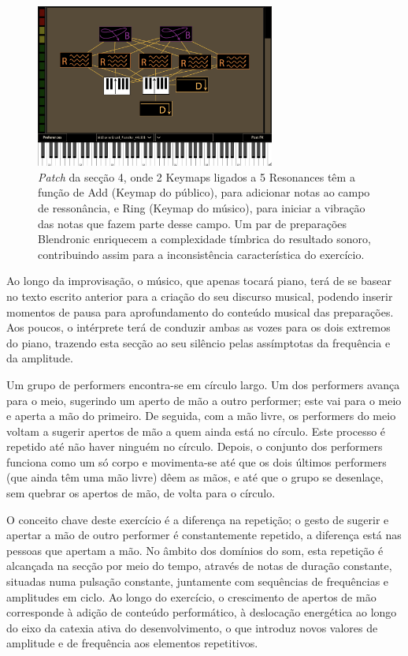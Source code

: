 \documentclass[../main.tex]{subfiles}
\begin{document}
\begin{figure}[h]
    \centering
    \captionsetup{width=0.8\textwidth}
    \includegraphics[width=0.7\textwidth]{images/bit4.png}
    \caption{\textsl{Patch} da secção 4, onde 2 Keymaps ligados a 5 Resonances têm a função de Add (Keymap do público), para adicionar notas ao campo de ressonância, e Ring (Keymap do músico), para iniciar a vibração das notas que fazem parte desse campo. Um par de preparações Blendronic enriquecem a complexidade tímbrica do resultado sonoro, contribuindo assim para a inconsistência característica do exercício.}
    \label{fig:bit4}
\end{figure}

Ao longo da improvisação, o músico, que apenas tocará piano, terá de se basear no texto escrito anterior para a criação do seu discurso musical, podendo inserir momentos de pausa para aprofundamento do conteúdo musical das preparações. Aos poucos, o intérprete terá de conduzir ambas as vozes para os dois extremos do piano, trazendo esta secção ao seu silêncio pelas assímptotas da frequência e da amplitude.

\begin{performex}
    Um grupo de performers encontra-se em círculo largo. Um dos performers avança para o meio, sugerindo um aperto de mão a outro performer; este vai para o meio e aperta a mão do primeiro. De seguida, com a mão livre, os performers do meio voltam a sugerir apertos de mão a quem ainda está no círculo. Este processo é repetido até não haver ninguém no círculo. Depois, o conjunto dos performers funciona como um só corpo e movimenta-se até que os dois últimos performers (que ainda têm uma mão livre) dêem as mãos, e até que o grupo se desenlaçe, sem quebrar os apertos de mão, de volta para o círculo.
\end{performex}

O conceito chave deste exercício é a diferença na repetição; o gesto de sugerir e apertar a mão de outro performer é constantemente repetido, a diferença está nas pessoas que apertam a mão. No âmbito dos domínios do som, esta repetição é alcançada na secção por meio do tempo, através de notas de duração constante, situadas numa pulsação constante, juntamente com sequências de frequências e amplitudes em ciclo. Ao longo do exercício, o crescimento de apertos de mão corresponde à adição de conteúdo performático, à deslocação energética ao longo do eixo da catexia ativa do desenvolvimento, o que introduz novos valores de amplitude e de frequência aos elementos repetitivos.
\end{document}

